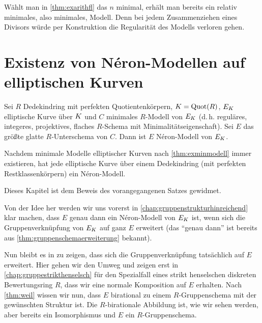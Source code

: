 \documentclass[german, bibliography=totoc]{scrreprt}
\begin{document}
\begin{Bemerkung}\label{bem:konstruktionminmodell}
  Wählt man in \ref{thm:exarithfl} das $n$ minimal, erhält man bereits
  ein relativ minimales, also minimales, Modell. Denn
  bei jedem Zusammenziehen eines Divisors würde per Konstruktion die
  Regularität des Modells verloren gehen.
\end{Bemerkung}




\chapter{Existenz von Néron-Modellen auf elliptischen Kurven}
\label{chap:exneronmodelle}
\begin{Satz}\label{thm:exneronmodelle}

  Sei $R$ Dedekindring mit perfekten Quotientenkörpern,
  $K=\operatorname{Quot}(R)$, $E_{K}$ elliptische Kurve über $K$ und $C$ minimales
  $R$-Modell von $E_{K}$
  (d.\,h. reguläres, integeres, projektives,
  flaches $R$-Schema mit Minimalitätseigenschaft).
  Sei $E$ das größte glatte $R$-Unterschema von $C$.
  Dann ist $E$ Néron-Modell von $E_{K}$.

  Nachdem minimale Modelle elliptischer
  Kurven nach \ref{thm:exminmodell} immer existieren, hat jede
  elliptische Kurve über einem Dedekindring (mit perfekten
  Restklassenkörpern) ein Néron-Modell.
\end{Satz}
Dieses Kapitel ist dem Beweis des vorangegangenen Satzes gewidmet.

Von der Idee her werden wir uns vorerst in
\autoref{chap:gruppenstrukturhinreichend} klar machen, dass $E$ genau 
dann ein Néron-Modell von $E_{K}$ ist, wenn sich die Gruppenverknüpfung
von $E_{K}$ auf ganz $E$ erweitert (das \enquote{genau dann} ist
bereits aus \ref{thm:gruppenschemaerweiterung} bekannt).

Nun bleibt es in zu zeigen, dass sich die Gruppenverknüpfung tatsächlich
auf $E$ erweitert.
Hier gehen wir den Umweg und zeigen erst in
\autoref{chap:gruppestrikthenselsch} für den Spezialfall eines
strikt henselschen diskreten Bewertungsring $R$, dass wir eine normale
Komposition auf $E$ erhalten. Nach \ref{thm:weil} wissen wir nun, dass
$E$ birational zu einem $R$-Gruppenschema mit der gewünschten Struktur
ist. Die $R$-birationale Abbildung ist, wie wir sehen werden, aber
bereits ein Isomorphismus und $E$ ein $R$-Gruppenschema.
\end{document}

